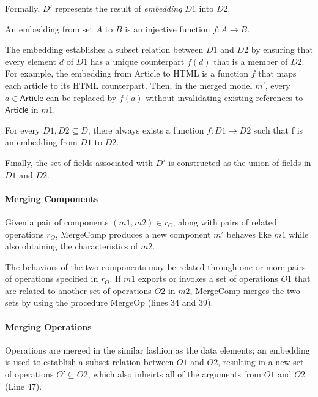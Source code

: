 Formally, $D'$ represents the result of \textit{embedding} $D1$ into
$D2$.
\begin{defn} An embedding from set $A$ to $B$ is an injective function
  $f : A \rightarrow B$.
\end{defn}
The embedding establishes a subset relation between $D1$ and $D2$ by
ensuring that every element $d$ of $D1$ has a unique counterpart
$f(d)$ that is a member of $D2$. For example, the embedding from
\textsf{Article} to \textsf{HTML} is a function $f$ that maps each
article to its HTML counterpart. Then, in the merged model $m'$, every
$a \in \textsf{Article}$ can be replaced by $f(a)$ without
invalidating existing references to $\textsf{Article}$ in $m1$.

\begin{thm} For every $D1, D2 \subseteq D$, there always exists a
  function $f : D1 \rightarrow D2$ such that f is an embedding from
  $D1$ to $D2$.
\end{thm}

Finally, the set of fields associated with $D'$ is constructed as the
union of fields in $D1$ and $D2$. 

\paragraph{\textbf{Merging Components}} Given a pair of components $(m1, m2)
\in r_{C}$, along with pairs of related operations $r_{O}$,
\textsf{MergeComp} produces a new component $m'$ behaves like $m1$
while also obtaining the characteristics of $m2$.

The behaviors of the two components may be related through one or more
pairs of operations specified in $r_{O}$. If $m1$ exports or invokes
a set of operations $O1$ that are related to another set of operations
$O2$ in $m2$, \textsf{MergeComp} merges the two sets by using the
procedure \textsf{MergeOp} (lines 34 and 39). 

\paragraph{\textbf{Merging Operations}} Operations are merged in the
similar fashion as the data elements; an embedding is used to
establish a subset relation between $O1$ and $O2$, resulting in a new
set of operations $O' \subseteq O2$, which also inheirts all of the
arguments from $O1$ and $O2$ (Line 47).

